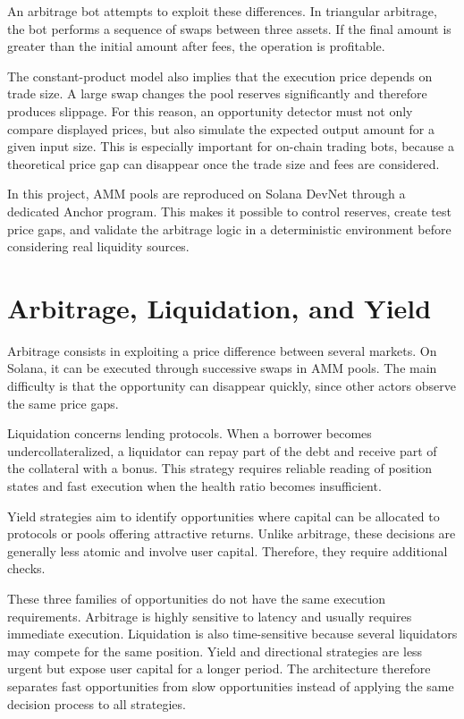 \documentclass[12pt,a4paper]{report}
\begin{document}
An arbitrage bot attempts to exploit these differences. In triangular arbitrage, the bot performs a sequence of swaps between three assets. If the final amount is greater than the initial amount after fees, the operation is profitable.

The constant-product model also implies that the execution price depends on trade size. A large swap changes the pool reserves significantly and therefore produces slippage. For this reason, an opportunity detector must not only compare displayed prices, but also simulate the expected output amount for a given input size. This is especially important for on-chain trading bots, because a theoretical price gap can disappear once the trade size and fees are considered.

In this project, AMM pools are reproduced on Solana DevNet through a dedicated Anchor program. This makes it possible to control reserves, create test price gaps, and validate the arbitrage logic in a deterministic environment before considering real liquidity sources.

\section{Arbitrage, Liquidation, and Yield}

Arbitrage consists in exploiting a price difference between several markets. On Solana, it can be executed through successive swaps in AMM pools. The main difficulty is that the opportunity can disappear quickly, since other actors observe the same price gaps.

Liquidation concerns lending protocols. When a borrower becomes undercollateralized, a liquidator can repay part of the debt and receive part of the collateral with a bonus. This strategy requires reliable reading of position states and fast execution when the health ratio becomes insufficient.

Yield strategies aim to identify opportunities where capital can be allocated to protocols or pools offering attractive returns. Unlike arbitrage, these decisions are generally less atomic and involve user capital. Therefore, they require additional checks.

These three families of opportunities do not have the same execution requirements. Arbitrage is highly sensitive to latency and usually requires immediate execution. Liquidation is also time-sensitive because several liquidators may compete for the same position. Yield and directional strategies are less urgent but expose user capital for a longer period. The architecture therefore separates fast opportunities from slow opportunities instead of applying the same decision process to all strategies.
\end{document}
